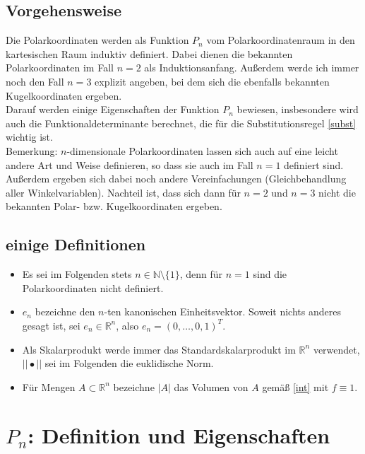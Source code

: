 \documentclass[a4paper,11pt]{scrartcl}
\newcommand{\R}{{\ensuremath{\mathbb{R}}}}
\newcommand{\N}{{\ensuremath{\mathbb{N}}}}
\newcommand{\const}{\ensuremath{\equiv}}
\begin{document}
\subsection{Vorgehensweise}
Die Polarkoordinaten werden als Funktion $P_n$ vom \glqq Polarkoordinatenraum\grqq{} in den kartesischen Raum induktiv definiert. Dabei dienen die bekannten Polarkoordinaten im Fall $n=2$ als Induktionsanfang. Außerdem werde ich immer noch den Fall $n=3$ explizit angeben, bei dem sich die ebenfalls bekannten Kugelkoordinaten ergeben.\\
Darauf werden einige Eigenschaften der Funktion $P_n$ bewiesen, insbesondere wird auch die Funktionaldeterminante berechnet, die für die Substitutionsregel \eqref{subst}
wichtig ist.\\
Bemerkung: $n$-dimensionale Polarkoordinaten lassen sich auch auf eine leicht andere Art und Weise definieren, so dass sie auch im Fall $n=1$ definiert sind. Außerdem ergeben sich dabei noch andere Vereinfachungen (Gleichbehandlung aller Winkelvariablen). Nachteil ist, dass sich dann für $n=2$ und $n=3$ nicht die bekannten Polar- bzw. Kugelkoordinaten ergeben.
\subsection{einige Definitionen}
\begin{itemize}
\item Es sei im Folgenden stets $n\in\N\setminus\{1\}$, denn für $n=1$ sind die Polarkoordinaten nicht definiert.
\item $e_n$ bezeichne den $n$-ten kanonischen Einheitsvektor. Soweit nichts anderes gesagt ist, sei $e_n\in\R^n$, also $e_n=(0,\ldots,0,1)^T$.
\item Als Skalarprodukt werde immer das Standardskalarprodukt im $\R^n$ verwendet, $||\bullet||$ sei im Folgenden die euklidische Norm.
\item Für Mengen $A\subset \R^n$ bezeichne $|A|$ das Volumen von $A$ gemäß \eqref{int} mit $f\const 1$.
\end{itemize}
\section{$P_n$: Definition und Eigenschaften}
\end{document}
